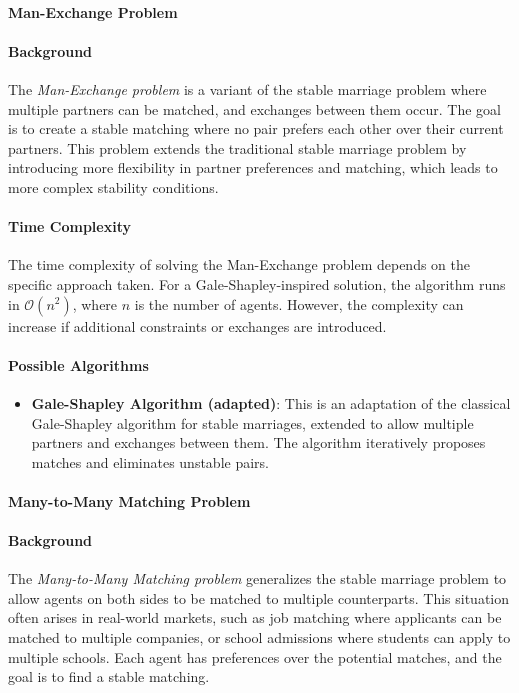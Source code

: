 \paragraph{Man-Exchange Problem}

\paragraph{Background}
The \emph{Man-Exchange problem} is a variant of the stable marriage problem where multiple partners can be matched, and exchanges between them occur. The goal is to create a stable matching where no pair prefers each other over their current partners. This problem extends the traditional stable marriage problem by introducing more flexibility in partner preferences and matching, which leads to more complex stability conditions. \cite{survey}

\paragraph{Time Complexity}
The time complexity of solving the Man-Exchange problem depends on the specific approach taken. For a Gale-Shapley-inspired solution, the algorithm runs in \(\mathcal{O}(n^2)\), where \(n\) is the number of agents. However, the complexity can increase if additional constraints or exchanges are introduced.

\paragraph{Possible Algorithms}
\begin{itemize}
    \item \textbf{Gale-Shapley Algorithm (adapted)}: This is an adaptation of the classical Gale-Shapley algorithm for stable marriages, extended to allow multiple partners and exchanges between them. The algorithm iteratively proposes matches and eliminates unstable pairs. \cite{gusfield}
\end{itemize}

\paragraph{Many-to-Many Matching Problem}

\paragraph{Background}
The \emph{Many-to-Many Matching problem} generalizes the stable marriage problem to allow agents on both sides to be matched to multiple counterparts. This situation often arises in real-world markets, such as job matching where applicants can be matched to multiple companies, or school admissions where students can apply to multiple schools. Each agent has preferences over the potential matches, and the goal is to find a stable matching. \cite{survey}

